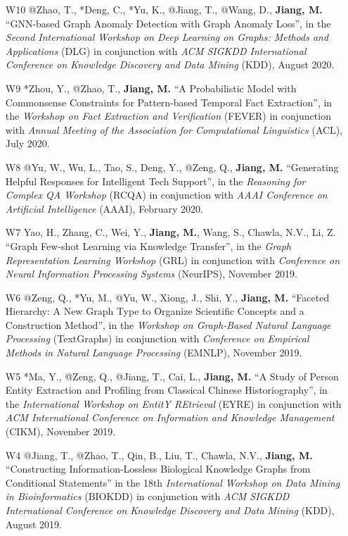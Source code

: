 \documentclass[10pt]{article}
\newenvironment{myindentpar}[1]%
{\begin{list}{}%
         {\setlength{\leftmargin}{#1}}%
         \item[]%
}
{\end{list}}
\newcounter{list}
\begin{document}
\begin{myindentpar}{0.00cm}
\begin{enumerate}[leftmargin=.5cm]
\item[W10] @Zhao, T., *Deng, C., *Yu, K., @Jiang, T., @Wang, D., \textbf{Jiang, M.} ``GNN-based Graph Anomaly Detection with Graph Anomaly Loss'', in the \textit{Second International Workshop on Deep Learning on Graphs: Methods and Applications} (DLG) in conjunction with \textit{ACM SIGKDD International Conference on Knowledge Discovery and Data Mining} (KDD), August 2020.

\item[W9] *Zhou, Y., @Zhao, T., \textbf{Jiang, M.} ``A Probabilistic Model with Commonsense Constraints for Pattern-based Temporal Fact Extraction'', in the \textit{Workshop on Fact Extraction and Verification} (FEVER) in conjunction with \textit{Annual Meeting of the Association for Computational Linguistics} (ACL), July 2020.

\item[W8] @Yu, W., Wu, L., Tao, S., Deng, Y., @Zeng, Q., \textbf{Jiang, M.} ``Generating Helpful Responses for Intelligent Tech Support'', in the \textit{Reasoning for Complex QA  Workshop} (RCQA) in conjunction with \textit{AAAI Conference on Artificial Intelligence} (AAAI), February 2020.

\item[W7] Yao, H., Zhang, C., Wei, Y., \textbf{Jiang, M.}, Wang, S., Chawla, N.V., Li, Z. ``Graph Few-shot Learning via Knowledge Transfer'', in the \textit{Graph Representation Learning Workshop} (GRL) in conjunction with \textit{Conference on Neural Information Processing Systems} (NeurIPS), November 2019.
	
\item[W6] @Zeng, Q., *Yu, M., @Yu, W., Xiong, J., Shi, Y., \textbf{Jiang, M.} ``Faceted Hierarchy: A New Graph Type to Organize Scientific Concepts and a Construction Method'', in the \textit{Workshop on Graph-Based Natural Language Processing} (TextGraphs) in conjunction with \textit{Conference on Empirical Methods in Natural Language Processing} (EMNLP), November 2019.

\item[W5] *Ma, Y., @Zeng, Q., @Jiang, T., Cai, L., \textbf{Jiang, M.} ``A Study of Person Entity Extraction and Profiling from Classical Chinese Historiography'', in the \textit{International Workshop on EntitY REtrieval} (EYRE) in conjunction with \textit{ACM International Conference on Information and Knowledge Management} (CIKM), November 2019.

\item[W4] @Jiang, T., @Zhao, T., Qin, B., Liu, T., Chawla, N.V., \textbf{Jiang, M.} ``Constructing Information-Lossless Biological Knowledge Graphs from Conditional Statements'' in the 18th \textit{International Workshop on Data Mining in Bioinformatics} (BIOKDD) in conjunction with \textit{ACM SIGKDD International Conference on Knowledge Discovery and Data Mining} (KDD), August 2019.


\end{enumerate}
\end{myindentpar}
\end{document}
